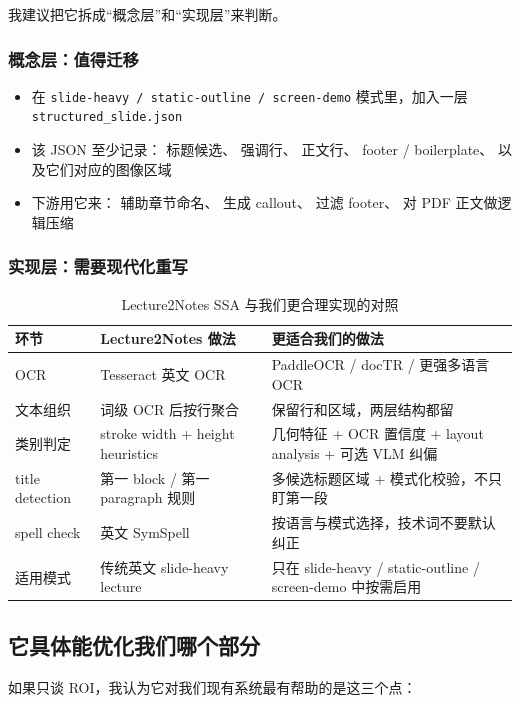 \documentclass[a4paper]{article}
\begin{document}
我建议把它拆成“概念层”和“实现层”来判断。

\subsubsection{概念层：值得迁移}

\begin{itemize}
\item 在 \texttt{slide-heavy / static-outline / screen-demo} 模式里，加入一层 \texttt{structured\_slide.json}
\item 该 JSON 至少记录：
  标题候选、
  强调行、
  正文行、
  footer / boilerplate、
  以及它们对应的图像区域
\item 下游用它来：
  辅助章节命名、
  生成 callout、
  过滤 footer、
  对 PDF 正文做逻辑压缩
\end{itemize}

\subsubsection{实现层：需要现代化重写}

\begin{table}[H]
\centering
\caption{Lecture2Notes SSA 与我们更合理实现的对照}
\begin{tabularx}{\textwidth}{p{3.1cm}p{4.0cm}Y}
\toprule
环节 & Lecture2Notes 做法 & 更适合我们的做法 \\
\midrule
OCR & Tesseract 英文 OCR & PaddleOCR / docTR / 更强多语言 OCR \\
文本组织 & 词级 OCR 后按行聚合 & 保留行和区域，两层结构都留 \\
类别判定 & stroke width + height heuristics & 几何特征 + OCR 置信度 + layout analysis + 可选 VLM 纠偏 \\
title detection & 第一 block / 第一 paragraph 规则 & 多候选标题区域 + 模式化校验，不只盯第一段 \\
spell check & 英文 SymSpell & 按语言与模式选择，技术词不要默认纠正 \\
适用模式 & 传统英文 slide-heavy lecture & 只在 slide-heavy / static-outline / screen-demo 中按需启用 \\
\bottomrule
\end{tabularx}
\end{table}

\subsection{它具体能优化我们哪个部分}

如果只谈 ROI，我认为它对我们现有系统最有帮助的是这三个点：
\end{document}
